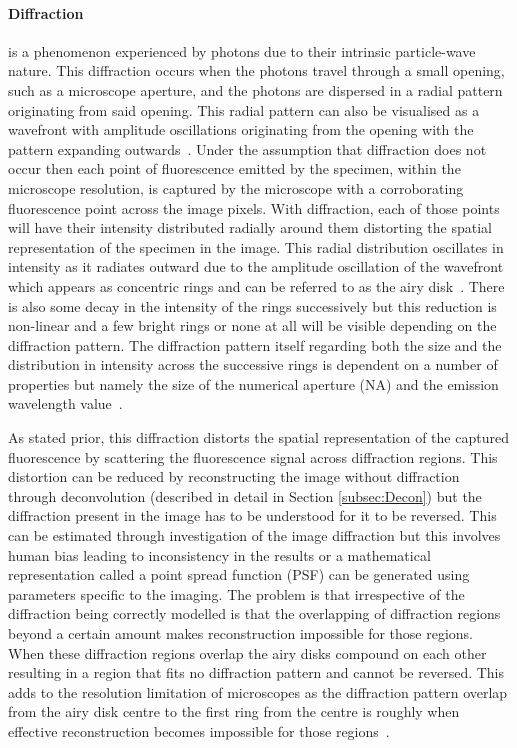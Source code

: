 \paragraph{Diffraction} is a phenomenon experienced by photons due to their intrinsic particle-wave nature. This diffraction occurs when the photons travel through a small opening, such as a microscope aperture, and the photons are dispersed in a radial pattern originating from said opening. This radial pattern can also be visualised as a wavefront with amplitude oscillations originating from the opening with the pattern expanding outwards~\cite{Diffraction_Patterson}. 
Under the assumption that diffraction does not occur then each point of fluorescence emitted by the specimen, within the microscope resolution, is captured by the microscope with a corroborating fluorescence point across the image pixels. With diffraction, each of those points will have their intensity distributed radially around them distorting the spatial representation of the specimen in the image. This radial distribution oscillates in intensity as it radiates outward due to the amplitude oscillation of the wavefront which appears as concentric rings and can be referred to as the airy disk~\cite{Diffraction_Dedecker}. There is also some decay in the intensity of the rings successively but this reduction is non-linear and a few bright rings or none at all will be visible depending on the diffraction pattern. The diffraction pattern itself regarding both the size and the distribution in intensity across the successive rings is dependent on a number of properties but namely the size of the numerical aperture (NA) and the emission wavelength value~\cite{Diffraction_Patterson}.\par As stated prior, this diffraction distorts the spatial representation of the captured fluorescence by scattering the fluorescence signal across diffraction regions. This distortion can be reduced by reconstructing the image without diffraction through deconvolution (described in detail in Section \ref{subsec:Decon}) but the diffraction present in the image has to be understood for it to be reversed. This can be estimated through investigation of the image diffraction but this involves human bias leading to inconsistency in the results or a mathematical representation called a point spread function (PSF) can be generated using parameters specific to the imaging. The problem is that irrespective of the diffraction being correctly modelled is that the overlapping of diffraction regions beyond a certain amount makes reconstruction impossible for those regions. When these diffraction regions overlap the airy disks compound on each other resulting in a region that fits no diffraction pattern and cannot be reversed. This adds to the resolution limitation of microscopes as the diffraction pattern overlap from the airy disk centre to the first ring from the centre is roughly when effective reconstruction becomes impossible for those regions~\cite{Diffraction_Dedecker, Diffraction_Patterson}.

